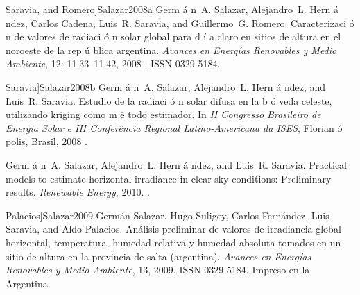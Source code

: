 \documentclass[letterpaper,12pt, twoside]{report}
\providecommand{\DIFdeltex}[1]{{\protect\color{red} \scriptsize #1}} %
\providecommand{\DIFdel}[1]{\texorpdfstring{\DIFdeltex{#1}}{}} %
\begin{document}
  Saravia, and Romero]{Salazar2008a}
\DIFdel{Germ}%
\DIFdel{\'a}%
\DIFdel{n~A. Salazar, Alejandro~L. Hern}%
\DIFdel{\'a}%
\DIFdel{ndez, Carlos Cadena, Luis~R.
  Saravia, and Guillermo~G. Romero.
}%
\DIFdel{Caracterizaci}%
\DIFdel{\'o}%
\DIFdel{n de valores de radiaci}%
\DIFdel{\'o}%
\DIFdel{n solar global para
  d}%
\DIFdel{\'i}%
\DIFdel{a claro en sitios de altura en el noroeste de la rep}%
\DIFdel{\'u}%
\DIFdel{blica
  argentina.
}%
\DIFdel{\emph{Avances en Energ{\'i}as Renovables y Medio Ambiente},
  12:}%
\DIFdel{11.33--11.42, 2008}%
\DIFdel{.
}%
\DIFdel{ISSN 0329-5184.
}%

  Saravia]{Salazar2008b}
\DIFdel{Germ}%
\DIFdel{\'a}%
\DIFdel{n~A. Salazar, Alejandro~L. Hern}%
\DIFdel{\'a}%
\DIFdel{ndez, and Luis~R. Saravia.
}%
\DIFdel{Estudio de la radiaci}%
\DIFdel{\'o}%
\DIFdel{n solar difusa en la b}%
\DIFdel{\'o}%
\DIFdel{veda celeste,
  utilizando kriging como m}%
\DIFdel{\'e}%
\DIFdel{todo estimador.
}%
\DIFdel{In \emph{II Congresso Brasileiro de Energia Solar e III
  Confer{\^e}ncia Regional Latino-Americana da ISES}, Florian}%
\DIFdel{\'o}%
\DIFdel{polis,
  Brasil, 2008}%
\DIFdel{.
}%

\DIFdel{Germ}%
\DIFdel{\'a}%
\DIFdel{n~A. Salazar, Alejandro~L. Hern}%
\DIFdel{\'a}%
\DIFdel{ndez, and Luis~R. Saravia.
}%
\DIFdel{Practical models to estimate horizontal irradiance in clear sky
  conditions: Preliminary results.
}%
\DIFdel{\emph{Renewable Energy}, 2010.
}%
\DIFdel{.
}%

  Palacios]{Salazar2009}
\DIFdel{Germán Salazar, Hugo Suligoy, Carlos Fernández, Luis Saravia, and Aldo
  Palacios.
}%
\DIFdel{Análisis preliminar de valores de irradiancia global horizontal,
  temperatura, humedad relativa y humedad absoluta tomados en un sitio de
  altura en la provincia de salta (argentina).
}%
\DIFdel{\emph{Avances en Energías Renovables y Medio Ambiente}, 13, 2009.
}%
\DIFdel{ISSN 0329-5184.
}%
\DIFdel{Impreso en la Argentina.
}%
\end{document}

